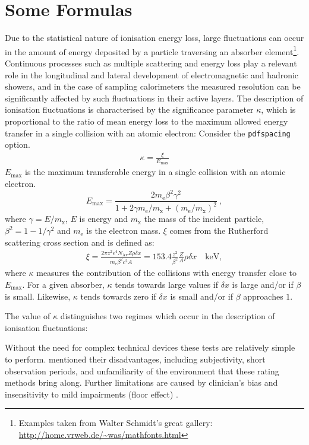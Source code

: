 \section{Some Formulas}

Due to the statistical nature of ionisation energy loss, large fluctuations can occur in the amount of energy deposited by a particle traversing an absorber element\footnote{Examples taken from Walter Schmidt's great gallery: \\ \url{http://home.vrweb.de/~was/mathfonts.html}}.  Continuous processes such as multiple scattering and energy loss play a relevant role in the longitudinal and lateral development of electromagnetic and hadronic showers, and in the case of sampling calorimeters the measured resolution can be significantly affected by such fluctuations in their active layers.  The description of ionisation fluctuations is characterised by the significance parameter $\kappa$, which is proportional to the ratio of mean energy loss to the maximum allowed energy transfer in a single collision with an atomic electron: Consider the \texttt{pdfspacing} option.
\begin{eqnarray}
\kappa =\frac{\xi}{E_{\mathrm{max}}} %
\end{eqnarray}
$E_{\mathrm{max}}$ is the maximum transferable energy in a single collision with an atomic electron.
\[E_{\mathrm{max}} =\frac{2 m_{\mathrm{e}} \beta^2\gamma^2 }{1 + 2\gamma m_{\mathrm{e}}/m_{\mathrm{x}} + \left ( m_{\mathrm{e}} /m_{\mathrm{x}}\right)^2}\ ,\]
where $\gamma = E/m_{\mathrm{x}}$, $E$ is energy and $m_{\mathrm{x}}$ the mass of the incident particle, $\beta^2 = 1 - 1/\gamma^2$ and $m_{\mathrm{e}}$ is the electron mass. $\xi$ comes from the Rutherford scattering cross section and is defined as:
\begin{eqnarray*} \xi  = \frac{2\pi z^2 e^4 N_{\mathrm{Av}} Z \rho
\delta x}{m_{\mathrm{e}} \beta^2 c^2 A} =  153.4 \frac{z^2}{\beta^2}
\frac{Z}{A}
\rho \delta x \quad\mathrm{keV},
\end{eqnarray*}
where $\kappa$ measures the contribution of the collisions with energy transfer close to $E_{\mathrm{max}}$.  For a given absorber, $\kappa$ tends towards large values if $\delta x$ is large and/or if $\beta$ is small.  Likewise, $\kappa$ tends towards zero if $\delta x $ is small and/or if $\beta$ approaches $1$.

The value of $\kappa$ distinguishes two regimes which occur in the description of ionisation fluctuations:

Without the need for complex technical devices these tests are relatively simple to perform. \citeauthor{klerk_long-term_2009} \cite{klerk_long-term_2009} mentioned their disadvantages, including subjectivity, short observation periods, and unfamiliarity of the environment that these rating methods bring along. Further limitations are caused by clinician's bias and insensitivity to mild impairments (floor effect) \cite{mancini_isway:_2012}.

